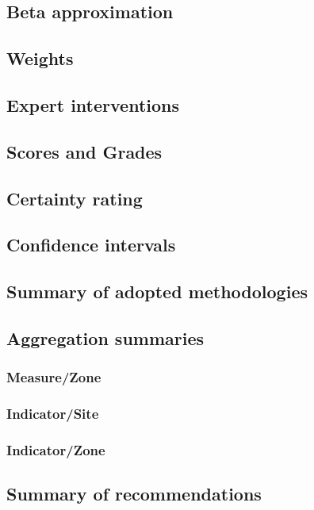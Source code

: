 \documentclass[a4paper]{AIMSreport}
\begin{document}
\subsection{Beta approximation}
\subsection{Weights}           
\subsection{Expert interventions}
\subsection{Scores and Grades}
\subsection{Certainty rating}
\subsection{Confidence intervals}

\subsection{Summary of adopted methodologies}
\subsection{Aggregation summaries}
\subsubsection{Measure/Zone} 
\subsubsection{Indicator/Site}
\subsubsection{Indicator/Zone}

\subsection{Summary of recommendations}
 
~\\[2em]



\clearpage
\end{document}
